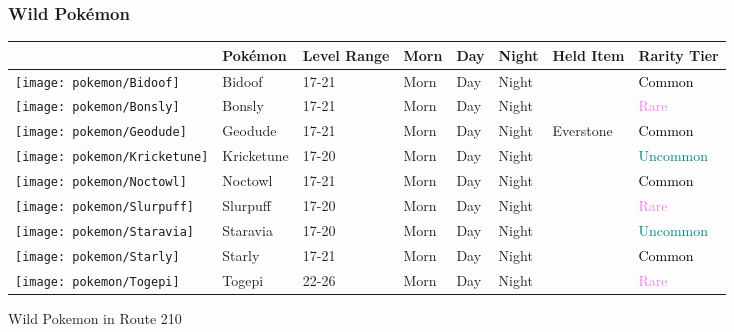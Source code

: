 \subsubsection{Wild Pokémon}%
\label{ssubsec:WildPokmon}%
\begin{longtable}{||l l l l l l l l||}%
\hline%
&Pokémon&Level Range&Morn&Day&Night&Held Item&Rarity Tier\\%
\hline%
\endhead%
\hline%
\texttt{[image: pokemon/Bidoof]}&Bidoof&17{-}21&Morn&Day&Night&&\textcolor{black}{%
Common%
}\\%
\hline%
\texttt{[image: pokemon/Bonsly]}&Bonsly&17{-}21&Morn&Day&Night&&\textcolor{violet}{%
Rare%
}\\%
\hline%
\texttt{[image: pokemon/Geodude]}&Geodude&17{-}21&Morn&Day&Night&Everstone&\textcolor{black}{%
Common%
}\\%
\hline%
\texttt{[image: pokemon/Kricketune]}&Kricketune&17{-}20&Morn&Day&Night&&\textcolor{teal}{%
Uncommon%
}\\%
\hline%
\texttt{[image: pokemon/Noctowl]}&Noctowl&17{-}21&Morn&Day&Night&&\textcolor{black}{%
Common%
}\\%
\hline%
\texttt{[image: pokemon/Slurpuff]}&Slurpuff&17{-}20&Morn&Day&Night&&\textcolor{violet}{%
Rare%
}\\%
\hline%
\texttt{[image: pokemon/Staravia]}&Staravia&17{-}20&Morn&Day&Night&&\textcolor{teal}{%
Uncommon%
}\\%
\hline%
\texttt{[image: pokemon/Starly]}&Starly&17{-}21&Morn&Day&Night&&\textcolor{black}{%
Common%
}\\%
\hline%
\texttt{[image: pokemon/Togepi]}&Togepi&22{-}26&Morn&Day&Night&&\textcolor{violet}{%
Rare%
}\\%
\hline%
\end{longtable}%
\caption{Wild Pokemon in Route 210}